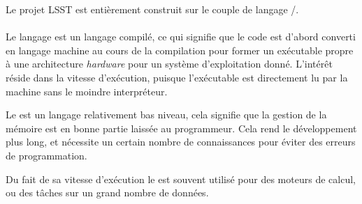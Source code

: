Le projet LSST est entièrement construit sur le couple de langage \Python/\Cpp.

			\paragraph{\Cpp}
Le langage \Cpp{} est un langage compilé, ce qui signifie que le code est d'abord converti en langage machine au cours de la compilation pour former un exécutable propre à une architecture \emph{hardware} pour un système d'exploitation donné. L'intérêt réside dans la vitesse d'exécution, puisque l'exécutable est directement lu par la machine sans le moindre interpréteur.

Le \Cpp{} est un langage relativement bas niveau, cela signifie que la gestion de la mémoire est en bonne partie laissée au programmeur. Cela rend le développement plus long, et nécessite un certain nombre de connaissances pour éviter des erreurs de programmation.

Du fait de sa vitesse d'exécution le \Cpp{} est souvent utilisé pour des moteurs de calcul, ou des tâches sur un grand nombre de données.

